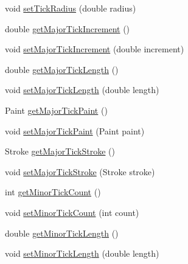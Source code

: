 \begin{DoxyCompactItemize}
void \mbox{\hyperlink{classorg_1_1jfree_1_1chart_1_1plot_1_1dial_1_1_standard_dial_scale_aeb6083a6e71773a81579db3412a73a9b}{set\+Tick\+Radius}} (double radius)
\item 
double \mbox{\hyperlink{classorg_1_1jfree_1_1chart_1_1plot_1_1dial_1_1_standard_dial_scale_afbf15ccabd854f33f1a6b2601c358352}{get\+Major\+Tick\+Increment}} ()
\item 
void \mbox{\hyperlink{classorg_1_1jfree_1_1chart_1_1plot_1_1dial_1_1_standard_dial_scale_afeabd8e29cd300186e06ad2a7683e7b1}{set\+Major\+Tick\+Increment}} (double increment)
\item 
double \mbox{\hyperlink{classorg_1_1jfree_1_1chart_1_1plot_1_1dial_1_1_standard_dial_scale_a075e82dfa28d221b97a512fb10469e64}{get\+Major\+Tick\+Length}} ()
\item 
void \mbox{\hyperlink{classorg_1_1jfree_1_1chart_1_1plot_1_1dial_1_1_standard_dial_scale_a3531e89f783571d0c9c07911e88aea6e}{set\+Major\+Tick\+Length}} (double length)
\item 
Paint \mbox{\hyperlink{classorg_1_1jfree_1_1chart_1_1plot_1_1dial_1_1_standard_dial_scale_a0c8dca20d8b757432a694aae2ae75267}{get\+Major\+Tick\+Paint}} ()
\item 
void \mbox{\hyperlink{classorg_1_1jfree_1_1chart_1_1plot_1_1dial_1_1_standard_dial_scale_a5a0156ff2213c5ad5cf20ffc4bee3f20}{set\+Major\+Tick\+Paint}} (Paint paint)
\item 
Stroke \mbox{\hyperlink{classorg_1_1jfree_1_1chart_1_1plot_1_1dial_1_1_standard_dial_scale_a0c2929b27154af3a0e35a389cf4c72e4}{get\+Major\+Tick\+Stroke}} ()
\item 
void \mbox{\hyperlink{classorg_1_1jfree_1_1chart_1_1plot_1_1dial_1_1_standard_dial_scale_a4c6d4803607415d70ea1219befec466a}{set\+Major\+Tick\+Stroke}} (Stroke stroke)
\item 
int \mbox{\hyperlink{classorg_1_1jfree_1_1chart_1_1plot_1_1dial_1_1_standard_dial_scale_afc449f87dcd315c12ecf88720ebd0097}{get\+Minor\+Tick\+Count}} ()
\item 
void \mbox{\hyperlink{classorg_1_1jfree_1_1chart_1_1plot_1_1dial_1_1_standard_dial_scale_a904e2576fc1d5d1a2e17cc67a51adca5}{set\+Minor\+Tick\+Count}} (int count)
\item 
double \mbox{\hyperlink{classorg_1_1jfree_1_1chart_1_1plot_1_1dial_1_1_standard_dial_scale_aee13f2cda92a34a11e9424428099f796}{get\+Minor\+Tick\+Length}} ()
\item 
void \mbox{\hyperlink{classorg_1_1jfree_1_1chart_1_1plot_1_1dial_1_1_standard_dial_scale_abbf5ad1e351dcecf1813b61aa830da76}{set\+Minor\+Tick\+Length}} (double length)

\end{DoxyCompactItemize}

